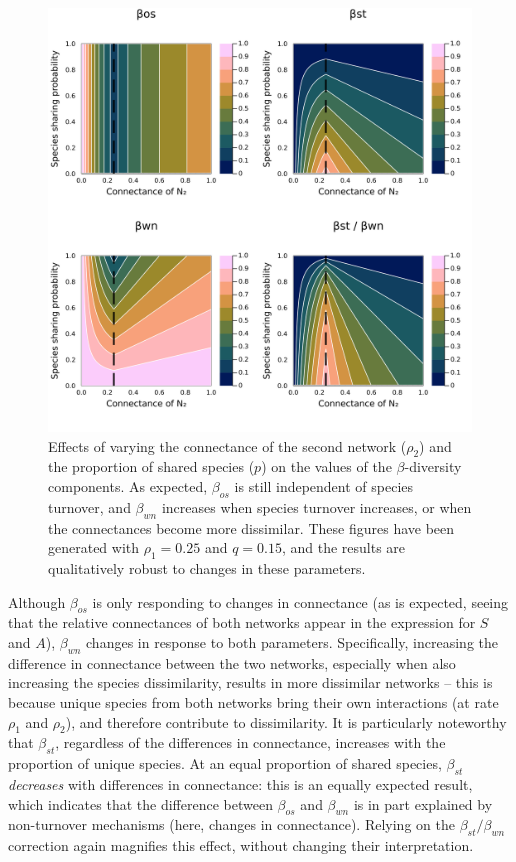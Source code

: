 \documentclass[11pt]{article}
\makeatletter
\def\maxwidth{\ifdim\Gin@nat@width>\linewidth\linewidth
\else\Gin@nat@width\fi}
\let\Oldincludegraphics\includegraphics
\renewcommand{\includegraphics}[1]{\Oldincludegraphics[width=\maxwidth]{#1}}
\makeatother
\begin{document}
\begin{figure}
\hypertarget{fig:numexp3}{%
\centering
\includegraphics{figures/numexp3.png}
\caption{Effects of varying the connectance of the second network
(\(\rho_2\)) and the proportion of shared species (\(p\)) on the values
of the \(\beta\)-diversity components. As expected, \(\beta_{os}\) is
still independent of species turnover, and \(\beta_{wn}\) increases when
species turnover increases, or when the connectances become more
dissimilar. These figures have been generated with \(\rho_1 = 0.25\) and
\(q = 0.15\), and the results are qualitatively robust to changes in
these parameters.}\label{fig:numexp3}
}
\end{figure}

Although \(\beta_{os}\) is only responding to changes in connectance (as
is expected, seeing that the relative connectances of both networks
appear in the expression for \(S\) and \(A\)), \(\beta_{wn}\) changes in
response to both parameters. Specifically, increasing the difference in
connectance between the two networks, especially when also increasing
the species dissimilarity, results in more dissimilar networks -- this
is because unique species from both networks bring their own
interactions (at rate \(\rho_1\) and \(\rho_2\)), and therefore
contribute to dissimilarity. It is particularly noteworthy that
\(\beta_{st}\), regardless of the differences in connectance, increases
with the proportion of unique species. At an equal proportion of shared
species, \(\beta_{st}\) \emph{decreases} with differences in
connectance: this is an equally expected result, which indicates that
the difference between \(\beta_{os}\) and \(\beta_{wn}\) is in part
explained by non-turnover mechanisms (here, changes in connectance).
Relying on the \(\beta_{st}/\beta_{wn}\) correction again magnifies this
effect, without changing their interpretation.
\end{document}
